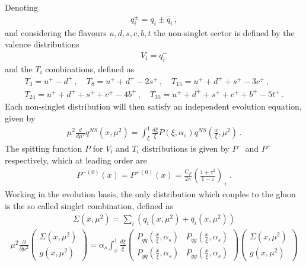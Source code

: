 Denoting 
\begin{align}
    q^{\pm}_i = q_i \pm \bar{q}_i\,,
\end{align}
and considering the flavours $u, d, s, c, b, t$ the non-singlet sector is defined by the valence distributions
\begin{align}
    V_i = q_i^-
\end{align} 
and the $T_i$ combinations, defined as
\begin{align}
    T_3 = u^+ - d^+\,,\,\,\,\,\,\,T_8 = u^+ + d^+ -2s^+\,,\,\,\,\,\,\,T_{15} = u^+ + d^+ + s^+ -3c^+\,,\,\,\,\,\,\, \\
    T_{24} = u^+ + d^+ + s^+ + c^+ -4b^+\,,\,\,\,\,\,\, T_{35} = u^+ + d^+ + s^+ + c^+ + b^+ - 5 t^+\,. 
\end{align}
Each non-singlet distribution will then satisfy an independent evolution equation, given by 
\begin{align}
    \label{eq:DGLAP_NS}
    \mu^2\frac{d}{d\mu^2}q^{NS}\left(x,\mu^2\right) 
    = \int_{\xi}^1\frac{d\xi}{\xi}P\left(\xi,\alpha_s\right)
    q^{NS}\left(\frac{x}{\xi},\mu^2\right)\,.
\end{align}
The spitting function $P$ for $V_i$ and $T_i$ distributions is given by $P^-$ and $P^+$ respectively,
which at leading order are
\begin{align}
    P^{-(0)}\left(x\right) = P^{+(0)}\left(x\right) = \frac{C_F}{2\pi}\left(\frac{1+z^2}{1-z}\right)_+ \,.
\end{align}
Working in the evolution basis, the only distribution which couples to the gluon is the so called
singlet combination, defined as
\begin{align}
    \Sigma\left(x,\mu^2\right) = \sum_i \left(q_i\left(x,\mu^2\right)+\bar{q}_i\left(x,\mu^2\right)\right)
\end{align}
\begin{align}
    \mu^2\frac{\partial}{\partial\mu^2}
    \begin{pmatrix}
        \Sigma\left(x,\mu^2\right) \\  
        g\left(x,\mu^2\right)
    \end{pmatrix}
    =
    \alpha_s\int_x^1 \frac{d\xi}{\xi} 
    \begin{pmatrix}
        P_{q q}\left(\frac{x}{\xi},\alpha_s\right) & P_{q g}\left(\frac{x}{\xi},\alpha_s\right) \\
        P_{g q}\left(\frac{x}{\xi},\alpha_s\right)   & P_{g g}\left(\frac{x}{\xi},\alpha_s\right) 
    \end{pmatrix}
    \begin{pmatrix}
        \Sigma\left(x,\mu^2\right) \\  
        g\left(x,\mu^2\right)
    \end{pmatrix}
\end{align}

